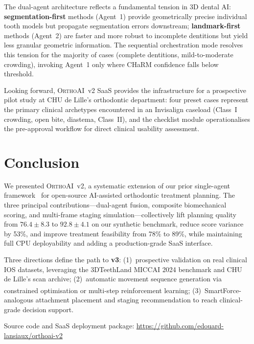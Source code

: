 \documentclass[10pt,twocolumn]{article}
\newcommand{\orthoai}{\textsc{OrthoAI}}
\newcommand{\vtwo}{\orthoai{}~v2}
\begin{document}
The dual-agent architecture reflects a fundamental tension in 3D dental AI:
\textbf{segmentation-first} methods (Agent~1) provide geometrically precise
individual tooth models but propagate segmentation errors downstream;
\textbf{landmark-first} methods (Agent~2) are faster and more robust to
incomplete dentitions but yield less granular geometric information.
The sequential orchestration mode resolves this tension for the majority
of cases (complete dentitions, mild-to-moderate crowding), invoking Agent~1
only where CHaRM confidence falls below threshold.

Looking forward, \vtwo{} SaaS provides the infrastructure for a prospective
pilot study at CHU de Lille's orthodontic department:
four preset cases represent the primary clinical archetypes encountered
in an Invisalign caseload (Class~I crowding, open bite, diastema, Class~II),
and the checklist module operationalises the pre-approval workflow
for direct clinical usability assessment.

\section{Conclusion}
\label{sec:conclusion}

We presented \vtwo{}, a systematic extension of our prior
single-agent framework~\cite{lansiaux2026orthoaiv1} for open-source
AI-assisted orthodontic treatment planning.
The three principal contributions---dual-agent fusion, composite biomechanical
scoring, and multi-frame staging simulation---collectively lift planning quality
from $76.4 \pm 8.3$ to $92.8 \pm 4.1$ on our synthetic benchmark,
reduce score variance by 53\%, and improve treatment feasibility from 78\%
to 89\%, while maintaining full CPU deployability and adding a production-grade
SaaS interface.

Three directions define the path to \textbf{v3}:
(1)~prospective validation on real clinical IOS datasets, leveraging the
3DTeethLand MICCAI 2024 benchmark and CHU de Lille's scan archive;
(2)~automatic movement sequence generation via constrained optimisation
or multi-step reinforcement learning;
(3)~SmartForce\textsuperscript{\textregistered}-analogous attachment placement
and staging recommendation to reach clinical-grade decision support.

Source code and SaaS deployment package:
\url{https://github.com/edouard-lansiaux/orthoai-v2}

\end{document}
